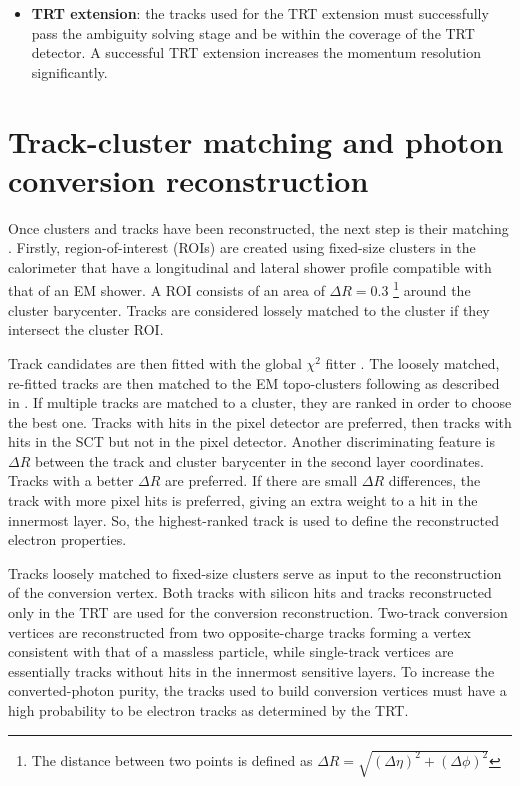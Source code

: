 \documentclass[a4paper, oneside, 11pt, openright]{book}
\begin{document}
\begin{itemize}
				\item \textbf{TRT extension}: the tracks used for the TRT extension must successfully pass the ambiguity solving stage and be within the coverage of the TRT detector. A successful TRT extension increases the momentum resolution significantly.
			\end{itemize}
			
		\section{Track-cluster matching and photon conversion reconstruction}
			Once clusters and tracks have been reconstructed, the next step is their matching \cite{Aad_2019}. Firstly, region-of-interest (ROIs) are created using fixed-size clusters in the calorimeter that have a longitudinal and lateral shower profile compatible with that of an EM shower. A ROI consists of an area of $\Delta R = 0.3$ \footnote{The distance between two points is defined as $\Delta R = \sqrt{(\Delta\eta)^2+(\Delta\phi)^2}$} around the cluster barycenter. Tracks are considered lossely matched to the cluster if they intersect the cluster ROI.
			
			
			Track candidates are then fitted with the global $\chi^2$ fitter \cite{ChiQuadro}. The loosely matched, re-fitted tracks are then matched to the EM topo-clusters following as described in \cite{Aad_2019}. If multiple tracks are matched to a cluster, they are ranked in order to choose the best one. Tracks with hits in the pixel detector are preferred, then tracks with hits in the SCT but not in the pixel detector. Another discriminating feature is $\Delta R$ between the track and cluster barycenter in the second layer coordinates. Tracks with a better $\Delta R$ are preferred. If there are small $\Delta R$ differences, the track with more pixel hits is preferred, giving an extra weight to a hit in the innermost layer. So, the highest-ranked track is used to define the reconstructed electron properties.
			
			Tracks loosely matched to fixed-size clusters serve as input to the reconstruction of the conversion vertex. Both tracks with silicon hits and tracks reconstructed only in the TRT are used for the conversion reconstruction. Two-track conversion vertices are reconstructed from two opposite-charge tracks forming a vertex consistent with that of a massless particle, while single-track vertices are essentially tracks without hits in the innermost sensitive layers. To increase the converted-photon purity, the tracks used to build conversion vertices must have a high probability to be electron tracks as determined by the TRT.
			
\end{document}
